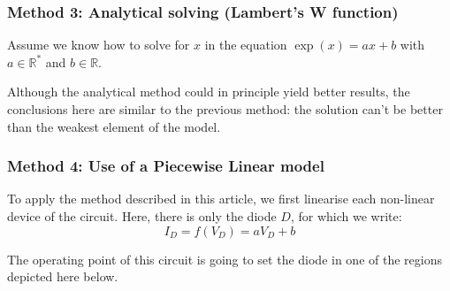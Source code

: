 \documentclass[10pt]{article}
\begin{document}
\subsubsection*{Method 3: Analytical solving (Lambert's W function)}
Assume we know how to solve for $x$ in the equation $\exp(x) = ax + b$ with $a \in \mathbb{R}^*$ and $b \in \mathbb{R}$. 

Although the analytical method could in principle yield better results, the conclusions here are similar to the previous method: the solution can't be better than the weakest element of the model.


\subsubsection*{Method 4: Use of a Piecewise Linear model}
To apply the method described in this article, we first linearise each non-linear device of the circuit. Here, there is only the diode $D$, for which we write:
$$
	I_D = f(V_D) = aV_D + b
$$

The operating point of this circuit is going to set the diode in one of the regions depicted here below.
\end{document}
